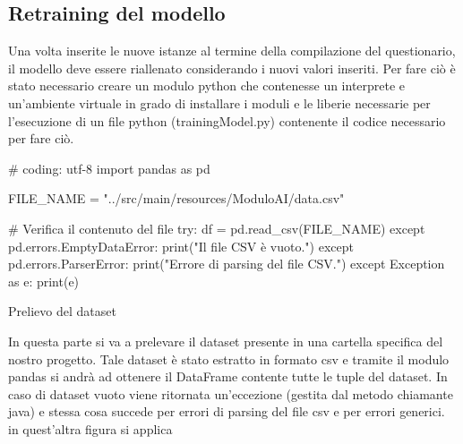 \subsection{Retraining del modello}
\fancyhead{}    %

Una volta inserite le nuove istanze al termine della compilazione del questionario, il modello deve essere riallenato considerando i nuovi valori inseriti.
Per fare ciò è stato necessario creare un modulo python che contenesse un interprete e un'ambiente virtuale in grado di installare i moduli e le liberie necessarie per l'esecuzione di un file python (trainingModel.py) contenente il codice necessario per fare ciò.

\begin{bashCode}
    \begin{tcolorbox}[colback=bgTitleRed, breakable, fontsize=\footnotesize]
    # coding: utf-8
    import pandas as pd
    
    FILE_NAME = "../src/main/resources/ModuloAI/data.csv"
    
    # Verifica il contenuto del file
    try:
        df = pd.read_csv(FILE_NAME)
    except pd.errors.EmptyDataError:
        print("Il file CSV è vuoto.")
    except pd.errors.ParserError:
        print("Errore di parsing del file CSV.")
    except Exception as e:
        print(e)
    \end{tcolorbox}
    \caption{Prelievo del dataset}
    \label{lst:python_code}
\end{bashCode}


In questa parte si va a prelevare il dataset presente in una cartella specifica del nostro progetto.
Tale dataset è stato estratto in formato csv e tramite il modulo pandas si andrà ad ottenere il DataFrame contente tutte le tuple del dataset.
In caso di dataset vuoto viene ritornata un'eccezione (gestita dal metodo chiamante java) e stessa cosa succede per errori di parsing del file csv e per errori generici.
in quest'altra figura si applica